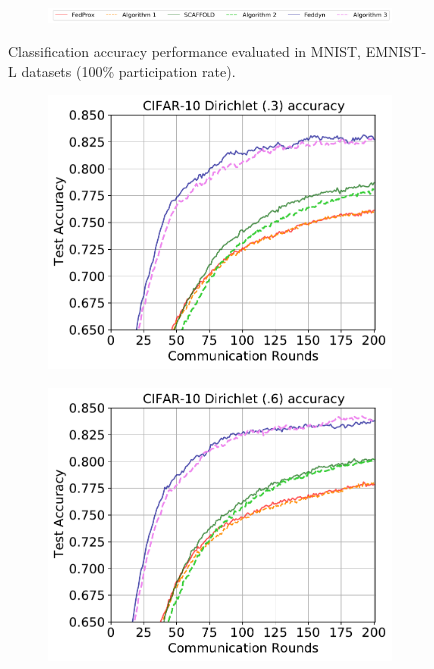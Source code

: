 \documentclass{article} %
\begin{document}
\begin{figure}[ht!]
\begin{subfigure}{.5\textwidth}
  \label{fig:sub16}
\end{subfigure}
\begin{subfigure}{1\textwidth}
  \centering
  \includegraphics[width=1\linewidth]{textfigure/legend.pdf}
  \label{fig:sub17}
\end{subfigure}
\caption{Classification accuracy performance evaluated in MNIST, EMNIST-L datasets (100\% participation rate).}
\label{fig:100peracc1}
\end{figure}

\begin{figure}[ht!]
\begin{subfigure}{.5\textwidth}
  \centering
  \includegraphics[width=.8\linewidth]{100perfig/cifar10_0.3.pdf}
  \label{fig:sub21}
\end{subfigure}
\begin{subfigure}{.5\textwidth}
  \centering
  \includegraphics[width=.8\linewidth]{100perfig/cifar10_0.6.pdf}

\end{subfigure}
\end{figure}
\end{document}
